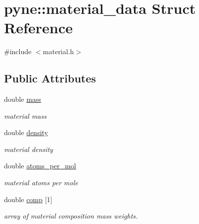 \hypertarget{structpyne_1_1material__data}{}\section{pyne\+:\+:material\+\_\+data Struct Reference}
\label{structpyne_1_1material__data}


{\ttfamily \#include $<$material.\+h$>$}

\subsection*{Public Attributes}
\begin{DoxyCompactItemize}
\item 
\mbox{\label{structpyne_1_1material__data_a8e5fa2bf074f5c7770fcefca825640b9}} 
double \hyperlink{structpyne_1_1material__data_a8e5fa2bf074f5c7770fcefca825640b9}{mass}
\begin{DoxyCompactList}\small\item\em material mass \end{DoxyCompactList}\item 
\mbox{\label{structpyne_1_1material__data_adf19d9e0612f5ea9c6093ad09c63eee4}} 
double \hyperlink{structpyne_1_1material__data_adf19d9e0612f5ea9c6093ad09c63eee4}{density}
\begin{DoxyCompactList}\small\item\em material density \end{DoxyCompactList}\item 
\mbox{\label{structpyne_1_1material__data_a135b69d35e0bc6c49a025a24cb153798}} 
double \hyperlink{structpyne_1_1material__data_a135b69d35e0bc6c49a025a24cb153798}{atoms\+\_\+per\+\_\+mol}
\begin{DoxyCompactList}\small\item\em material atoms per mole \end{DoxyCompactList}\item 
\mbox{\label{structpyne_1_1material__data_ac7c972f03200ebea0a958d28d73d7af9}} 
double \hyperlink{structpyne_1_1material__data_ac7c972f03200ebea0a958d28d73d7af9}{comp} \mbox{[}1\mbox{]}
\begin{DoxyCompactList}\small\item\em array of material composition mass weights. \end{DoxyCompactList}\end{DoxyCompactItemize}



